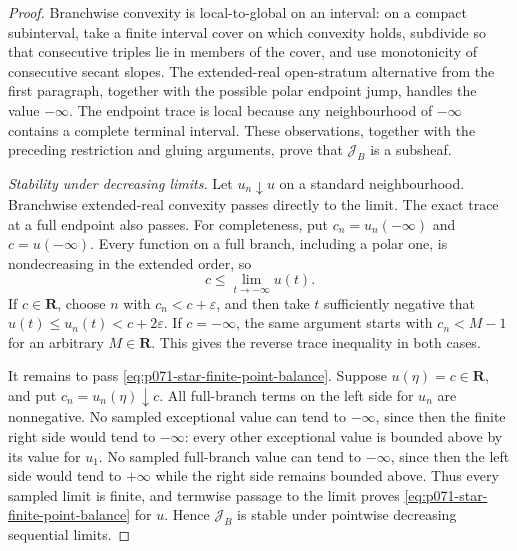 \begin{proof}
Branchwise convexity is local-to-global on an interval: on a compact
subinterval, take a finite interval cover on which convexity holds,
subdivide so that consecutive triples lie in members of the cover, and
use monotonicity of consecutive secant slopes.  The extended-real
open-stratum alternative from the first paragraph, together with the
possible polar endpoint jump, handles the value \(-\infty\).
The endpoint trace is local because any neighbourhood of \(-\infty\)
contains a complete terminal interval.  These observations, together
with the preceding restriction and gluing arguments, prove that
\(\mathscr J_B\) is a subsheaf.

\medskip\noindent
\emph{Stability under decreasing limits.}
Let \(u_n\downarrow u\) on a standard neighbourhood.  Branchwise
extended-real convexity passes directly to the limit.  The exact trace
at a full endpoint also passes.  For completeness, put
\(c_n=u_n(-\infty)\) and \(c=u(-\infty)\).  Every function on a full
branch, including a polar one, is nondecreasing in the extended order,
so
\[
 c\leq \lim_{t\to-\infty}u(t).
\]
If \(c\in\mathbf R\), choose \(n\) with \(c_n<c+\varepsilon\), and then
take \(t\) sufficiently negative that
\(u(t)\leq u_n(t)<c+2\varepsilon\).  If \(c=-\infty\), the same argument
starts with \(c_n<M-1\) for an arbitrary \(M\in\mathbf R\).  This gives
the reverse trace inequality in both cases.

It remains to pass
\eqref{eq:p071-star-finite-point-balance}.  Suppose
\(u(\eta)=c\in\mathbf R\), and put \(c_n=u_n(\eta)\downarrow c\).
All full-branch terms on the left side for \(u_n\) are nonnegative.  No
sampled exceptional value can tend to \(-\infty\), since then the finite
right side would tend to \(-\infty\): every other exceptional value is
bounded above by its value for \(u_1\).  No sampled full-branch value can
tend to \(-\infty\), since then the left side would tend to \(+\infty\)
while the right side remains bounded above.  Thus every sampled limit is
finite, and termwise passage to the limit proves
\eqref{eq:p071-star-finite-point-balance} for \(u\).  Hence
\(\mathscr J_B\) is stable under pointwise decreasing sequential limits.


\end{proof}
